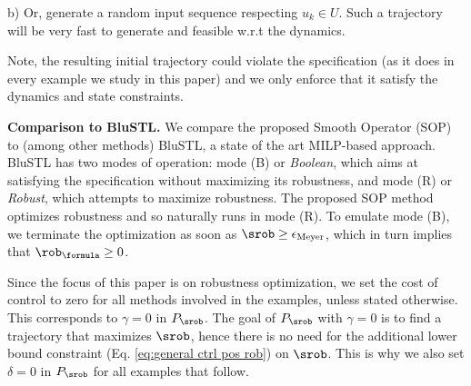 b) Or, generate a random input sequence respecting $u_k \in U$. 
Such a trajectory will be very fast to generate and feasible w.r.t the dynamics.%

Note, the resulting initial trajectory could violate the specification (as it does in every example we study in this paper) and we only enforce that it satisfy the dynamics and state constraints.

\textbf{Comparison to BluSTL.}
We compare the proposed Smooth Operator (SOP) to (among other methods) BluSTL, a state of the art MILP-based approach.
BluSTL has two modes of operation: mode (B) or \textit{Boolean}, which aims at satisfying the specification without maximizing its robustness, and mode (R) or \textit{Robust}, which attempts to maximize robustness. 
The proposed SOP method optimizes robustness and so naturally runs in mode (R).
To emulate mode (B), we terminate the optimization as soon as $\srob \geq \epsilon_{\text{Meyer}}$, which in turn implies that $\rob_{\formula} \geq 
0$. 

Since the focus of this paper is on robustness optimization, we set the cost of control to zero for all methods involved in the examples, unless stated otherwise. This corresponds to $\gamma=0$ in $P_{\srob}$. %
The goal of $P_{\srob}$ with $\gamma=0$ is to find a trajectory that maximizes $\srob$, hence there is no need for the additional lower bound constraint (Eq. \ref{eq:general ctrl pos rob}) on $\srob$. This is why we also set $\delta=0$ in $P_{\srob}$ for all examples that follow.




%
